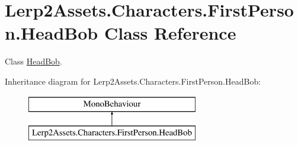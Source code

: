 \hypertarget{class_lerp2_assets_1_1_characters_1_1_first_person_1_1_head_bob}{}\section{Lerp2\+Assets.\+Characters.\+First\+Person.\+Head\+Bob Class Reference}
\label{class_lerp2_assets_1_1_characters_1_1_first_person_1_1_head_bob}


Class \hyperlink{class_lerp2_assets_1_1_characters_1_1_first_person_1_1_head_bob}{Head\+Bob}.  


Inheritance diagram for Lerp2\+Assets.\+Characters.\+First\+Person.\+Head\+Bob\+:\begin{figure}[H]
\begin{center}
\leavevmode
\includegraphics[height=2.000000cm]{class_lerp2_assets_1_1_characters_1_1_first_person_1_1_head_bob}
\end{center}
\end{figure}
